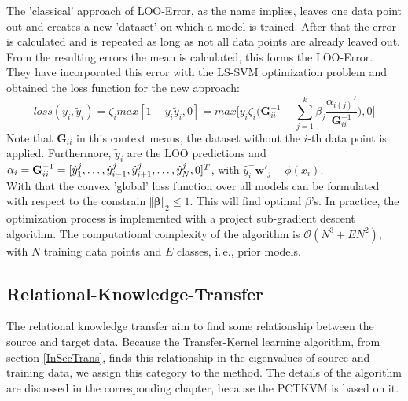 The 'classical' approach of \acs{LOO}-Error, as the name implies, leaves one data point out and creates a new 'dataset' on which a model is trained.
After that the error is calculated and is repeated as long as not all data points are already leaved out.
From the resulting errors the mean is calculated, this forms the \acl{LOO}-Error.\cite[p.74-76]{Evgeniou.2004}\\
They have incorporated this error with the \acs{LS-SVM} optimization problem and obtained the loss function for the new approach:\cite{Tommasi.}
\begin{equation}
loss(y_i,\tilde{y}_i)= \zeta_i max[1-y_i\tilde{y}_i,0] = max \bigg[y_i\zeta_i\bigg({\mathbf{G}^{-1}_{ii}} - \sum_{j=1}^{k}\beta_j \frac{\alpha_{i(j)}'}{\mathbf{G}^{-1}_{ii}}\bigg),0\bigg]
\end{equation}
Note that $\mathbf{G}_{ii}$ in this context means, the dataset without the $i$-th data point is applied.
Furthermore, $\tilde{y}_i$ are the \acs{LOO} predictions and $\alpha_i =\mathbf{G}_{ii}^{-1} = [\hat{y}_1^j,\dots,\hat{y}_{i-1}^j,\\\hat{y}_{i+1}^j,\dots,\hat{y}_N^j,0]^T$, with $\hat{y}_i^= \mathbf{w}'_j+\phi(x_i)$.\\
With that the convex 'global' loss function over all models can be formulated with respect to the constrain $\Vert\boldsymbol{\beta}\Vert_2\le 1$.
This will find optimal $\beta$'s.
In practice, the optimization process is implemented with a project sub-gradient descent algorithm.\cite{Tommasi.}
The computational complexity of the algorithm is $\mathcal{O}(N^3+EN^2)$, with $N$ training data points and $E$ classes, i.\,e., prior models.
\subsection{Relational-Knowledge-Transfer}\label{TlSubSecRelation}
The relational knowledge transfer aim to find some relationship between the source and target data.\cite[p. 7]{Weiss.2016}
Because the Transfer-Kernel learning algorithm, from section \ref{InSecTrans}, finds this relationship in the eigenvalues of source and training data, we assign this category to the method.
The details of the algorithm are discussed in the corresponding chapter, because the \acl{PCTKVM} is based on it.

